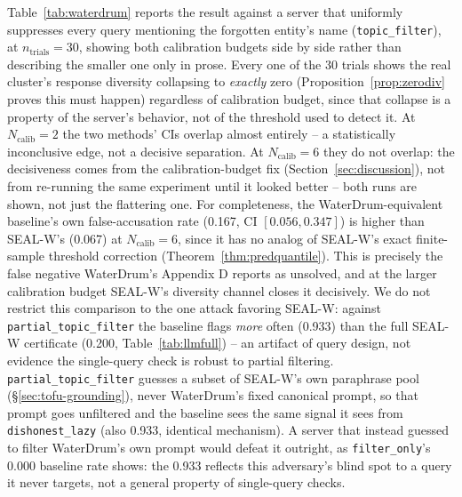 \documentclass[10pt,journal,compsoc]{IEEEtran}
\begin{document}
Table~\ref{tab:waterdrum} reports the result against a server that uniformly suppresses every query mentioning the forgotten entity's name (\texttt{topic\_filter}), at $n_{\text{trials}}=30$, showing both calibration budgets side by side rather than describing the smaller one only in prose. Every one of the 30 trials shows the real cluster's response diversity collapsing to \emph{exactly} zero (Proposition~\ref{prop:zerodiv} proves this must happen) regardless of calibration budget, since that collapse is a property of the server's behavior, not of the threshold used to detect it. At $N_{\text{calib}}=2$ the two methods' CIs overlap almost entirely -- a statistically inconclusive edge, not a decisive separation. At $N_{\text{calib}}=6$ they do not overlap: the decisiveness comes from the calibration-budget fix (Section~\ref{sec:discussion}), not from re-running the same experiment until it looked better -- both runs are shown, not just the flattering one. For completeness, the WaterDrum-equivalent baseline's own false-accusation rate (0.167, CI $[0.056, 0.347]$) is higher than SEAL-W's (0.067) at $N_{\text{calib}}=6$, since it has no analog of SEAL-W's exact finite-sample threshold correction (Theorem~\ref{thm:predquantile}). This is precisely the false negative WaterDrum's Appendix D reports as unsolved, and at the larger calibration budget SEAL-W's diversity channel closes it decisively. We do not restrict this comparison to the one attack favoring SEAL-W: against \texttt{partial\_topic\_filter} the baseline flags \emph{more} often (0.933) than the full SEAL-W certificate (0.200, Table~\ref{tab:llmfull}) -- an artifact of query design, not evidence the single-query check is robust to partial filtering. \texttt{partial\_topic\_filter} guesses a subset of SEAL-W's own paraphrase pool (\S\ref{sec:tofu-grounding}), never WaterDrum's fixed canonical prompt, so that prompt goes unfiltered and the baseline sees the same signal it sees from \texttt{dishonest\_lazy} (also 0.933, identical mechanism). A server that instead guessed to filter WaterDrum's own prompt would defeat it outright, as \texttt{filter\_only}'s 0.000 baseline rate shows: the 0.933 reflects this adversary's blind spot to a query it never targets, not a general property of single-query checks.
\end{document}
